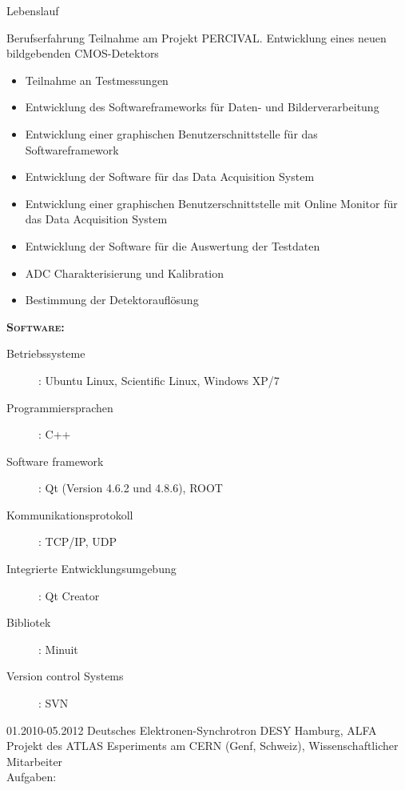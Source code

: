 \documentclass[11pt,a4paper]{scrartcl}
\begin{document}
\begin{cv}{Lebenslauf}
\begin{cvlist}{Berufserfahrung}
Teilnahme am Projekt PERCIVAL. Entwicklung eines neuen
bildgebenden CMOS-Detektors
\begin{itemize}
  \item Teilnahme an Testmessungen
  \item Entwicklung des Softwareframeworks f{\"u}r Daten- und
  Bilderverarbeitung
  \item Entwicklung einer graphischen Benutzerschnittstelle f{\"u}r  das Softwareframework
  \item Entwicklung der Software f{\"u}r das Data Acquisition
  System
  \item Entwicklung einer graphischen Benutzerschnittstelle mit Online
  Monitor f{\"u}r das Data Acquisition System
  \item Entwicklung der Software f{\"u}r die Auswertung der Testdaten
  \item ADC Charakterisierung und Kalibration
  \item Bestimmung der Detektoraufl{\"o}sung
\end{itemize}

{\scshape {\bfseries Software:}}
\begin{description}
\item[Betriebssysteme] : Ubuntu Linux, Scientific Linux, Windows
XP/7
\item[Programmiersprachen] : C++
\item[Software framework] : Qt (Version 4.6.2 und 4.8.6), ROOT
 \item[Kommunikationsprotokoll] : TCP/IP, UDP
\item[Integrierte Entwicklungsumgebung] : Qt Creator
\item[Bibliotek] : Minuit
\item[Version control Systems] : SVN
\end{description}

\item[01.2010-05.2012] Deutsches Elektronen-Synchrotron DESY
Hamburg, ALFA Projekt des ATLAS Esperiments am CERN (Genf,
Schweiz), Wissenschaftlicher Mitarbeiter \\

Aufgaben:\\


\end{cvlist}
\end{cv}
\end{document}
